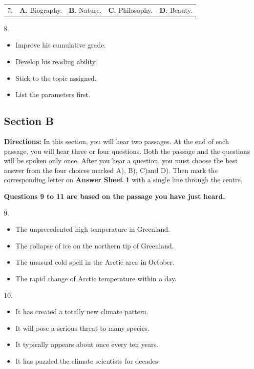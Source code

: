 \documentclass[UTF8,11pt]{ctexart}
\begin{document}
\noindent\begin{tabularx}{\linewidth}{@{}lXXXX@{}}7. & \textbf{A.} Biography. & \textbf{B.} Nature. & \textbf{C.} Philosophy. & \textbf{D.} Beauty.\\\end{tabularx}\par

8.


\begin{itemize}[leftmargin=2em,itemsep=.2em,topsep=.4em]\item[A.] Improve his cumulative grade.
\item[B.] Develop his reading ability.
\item[C.] Stick to the topic assigned.
\item[D.] List the parameters first.
\end{itemize}

\subsection*{\textbf{Section B}}


\textbf{Directions:} In this section, you will hear two passages. At the end of each passage, you will hear three or four questions. Both the passage and the questions will be spoken only once. After you hear a question, you must choose the best answer from the four choices marked A), B), C)and D). Then mark the corresponding letter on\textbf{ Answer Sheet 1} with a single line through the centre.


\textbf{Questions 9 to 11 are based on the passage you have just heard.}


9.


\begin{itemize}[leftmargin=2em,itemsep=.2em,topsep=.4em]\item[A.] The unprecedented high temperature in Greenland.
\item[B.] The collapse of ice on the northern tip of Greenland.
\item[C.] The unusual cold spell in the Arctic area in October.
\item[D.] The rapid change of Arctic temperature within a day.
\end{itemize}

10.


\begin{itemize}[leftmargin=2em,itemsep=.2em,topsep=.4em]\item[A.] It has created a totally new climate pattern.
\item[B.] It will pose a serious threat to many species.
\item[C.] It typically appears about once every ten years.
\item[D.] It has puzzled the climate scientists for decades.
\end{itemize}
\end{document}
